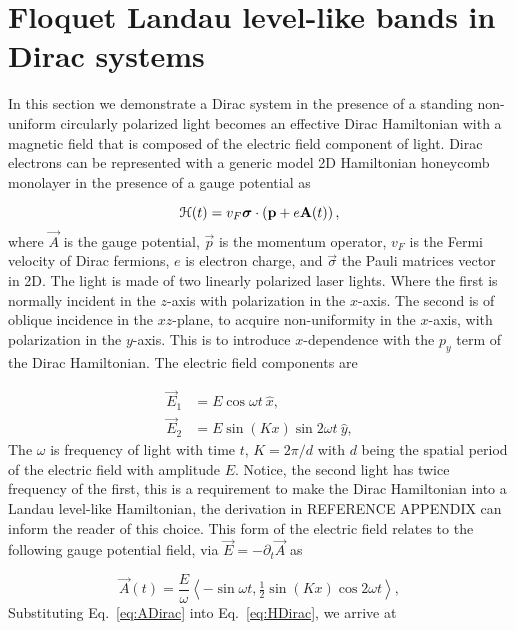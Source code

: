 \section{Floquet Landau level-like bands in Dirac systems}
In this section we demonstrate a Dirac system in the presence of a standing non-uniform circularly polarized light becomes an effective Dirac Hamiltonian with a magnetic field that is composed of the electric field component of light.
Dirac electrons can be represented with a generic model 2D Hamiltonian honeycomb monolayer in the presence of a gauge potential as

\begin{equation}\label{eq:HDirac}
  \mathcal{H}(t) = v_{F} \bm{\sigma} \cdot \left(\mathbf{p} + e\mathbf{A}(t)\right),
\end{equation}
where $\vec{A}$ is the gauge potential, $\vec{p}$ is the momentum operator, $v_F$ is the Fermi velocity of Dirac fermions, $e$ is electron charge, and $\vec{\sigma}$ the Pauli matrices vector in 2D.
The light is made of two linearly polarized laser lights.
Where the first is normally incident in the $z$-axis with polarization in the $x$-axis.
The second is of oblique incidence in the $xz$-plane, to acquire non-uniformity in the $x$-axis, with polarization in the $y$-axis.
This is to introduce $x$-dependence with the $p_y$ term of the Dirac Hamiltonian.
The electric field components are

\begin{align} \label{eq:EDfield}
\vec{E}_{1} &= E\cos \omega t\ \hat{x}, \nonumber \\
\vec{E}_{2} &= E\sin(Kx)\sin 2\omega t\ \hat{y},
\end{align}
The $\omega $ is frequency of light with time $t$, $K=2\pi /d$ with $d$ being the spatial period of the electric field with amplitude $E$.
Notice, the second light has twice frequency of the first, this is a requirement to make the Dirac Hamiltonian into a Landau level-like Hamiltonian, the derivation in REFERENCE APPENDIX can inform the reader of this choice.
This form of the electric field relates to the following gauge potential field, via $\vec{E} = -\partial_t \vec{A}$ as

\begin{equation}\label{eq:ADirac}
  \vec{A}(t)= \dfrac{E}{\omega} \left\langle -\sin \omega t, \tfrac{1}{2}\sin(Kx) \cos 2\omega t \right\rangle,
\end{equation}%
Substituting Eq.~\eqref{eq:ADirac} into Eq.~\eqref{eq:HDirac}, we arrive at%

